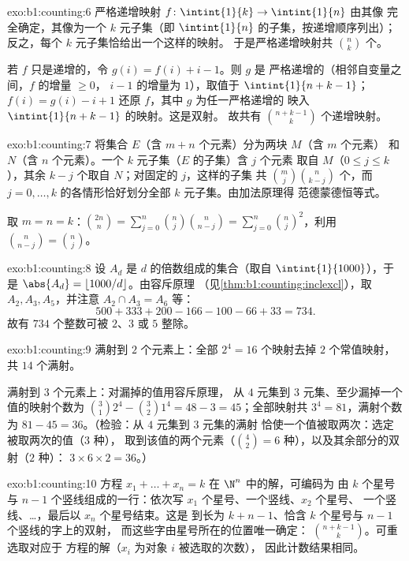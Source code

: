 \begin{solution}{exo:b1:counting:6}
严格递增映射 $f \colon \intint{1}{k} \to \intint{1}{n}$ 由其像
完全确定，其像为一个 $k$ 元子集（即 $\intint{1}{n}$ 的子集，按递增顺序列出）；
反之，每个 $k$ 元子集恰给出一个这样的映射。
于是严格递增映射共 $\binom nk$ 个。

若 $f$ 只是递增的，令 $g(i) = f(i) + i - 1$。则 $g$ 是
严格递增的（相邻自变量之间，$f$ 的增量 $\geq 0$，
$i - 1$ 的增量为 $1$），取值于 $\intint{1}{n + k - 1}$；
$f(i) = g(i) - i + 1$ 还原 $f$，其中 $g$ 为任一严格递增的
映入 $\intint{1}{n+k-1}$ 的映射。这是双射。
故共有 $\binom{n + k - 1}{k}$ 个递增映射。
\end{solution}

\begin{solution}{exo:b1:counting:7}
将集合 $E$（含 $m + n$ 个元素）分为两块 $M$（含 $m$ 个元素）
和 $N$（含 $n$ 个元素）。一个 $k$ 元子集（$E$ 的子集）含 $j$ 个元素
取自 $M$（$0 \leq j \leq k$），其余 $k - j$ 个取自 $N$；对固定的 $j$，这样的子集
共 $\binom mj \binom{n}{k-j}$ 个，而 $j = 0, \dots,
k$ 的各情形恰好划分全部 $k$ 元子集。由加法原理得
范德蒙德恒等式。

取 $m = n = k$：$\binom{2n}{n} = \sum_{j=0}^{n} \binom nj
\binom{n}{n-j} = \sum_{j=0}^{n} \binom nj^2$，利用 $\binom{n}{n-j} =
\binom nj$。
\end{solution}

\begin{solution}{exo:b1:counting:8}
设 $A_d$ 是 $d$ 的倍数组成的集合（取自 $\intint{1}{1000}$），于是
$\abs{A_d} = \lfloor 1000/d \rfloor$。由容斥原理
（见\cref{thm:b1:counting:inclexcl}），取 $A_2, A_3, A_5$，并注意
$A_2 \cap A_3 = A_6$ 等：
\[
500 + 333 + 200 - 166 - 100 - 66 + 33 = 734 .
\]
故有 $734$ 个整数可被 $2$、$3$ 或 $5$ 整除。
\end{solution}

\begin{solution}{exo:b1:counting:9}
满射到 $2$ 个元素上：全部 $2^4 = 16$ 个映射去掉 $2$ 个常值映射，
共 $14$ 个满射。

满射到 $3$ 个元素上：对漏掉的值用容斥原理，
从 $4$ 元集到 $3$ 元集、至少漏掉一个值的映射个数为
$\binom 31 2^4 - \binom 32 1^4 = 48 - 3 = 45$；全部映射共 $3^4 =
81$，满射个数为 $81 - 45 = 36$。（检验：从 $4$ 元集到 $3$ 元集的满射
恰使一个值被取两次：选定被取两次的值（$3$ 种），
取到该值的两个元素（$\binom 42 = 6$ 种），以及其余部分的双射（$2$ 种）：
$3 \times 6 \times 2 = 36$。）
\end{solution}

\begin{solution}{exo:b1:counting:10}
方程 $x_1 + \dots + x_n = k$ 在 $\N^n$ 中的解，可编码为
由 $k$ 个星号与 $n - 1$ 个竖线组成的一行：依次写 $x_1$ 个星号、一个竖线、$x_2$ 个星号、
一个竖线、\dots，最后以 $x_n$ 个星号结束。这是
到长为 $k + n - 1$、恰含 $k$ 个星号与 $n - 1$ 个竖线的字上的双射，
而这些字由星号所在的位置唯一确定：
$\binom{n + k - 1}{k}$。可重选取对应于
方程的解（$x_i$ 为对象 $i$ 被选取的次数），
因此计数结果相同。
\end{solution}

